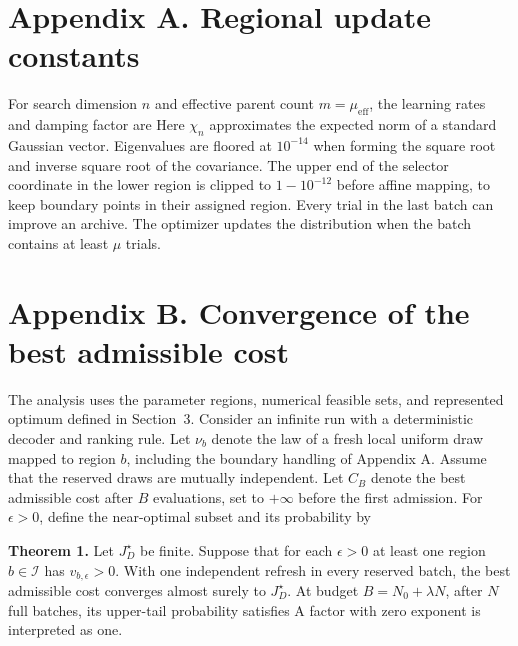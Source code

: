 \appendix
\section*{Appendix A. Regional update constants}
For search dimension $n$ and effective parent count $m=\mu_{\mathrm{eff}}$, the learning rates and damping factor are
Here $\chi_n$ approximates the expected norm of a standard Gaussian vector. Eigenvalues are floored at $10^{-14}$ when forming the square root and inverse square root of the covariance. The upper end of the selector coordinate in the lower region is clipped to $1-10^{-12}$ before affine mapping, to keep boundary points in their assigned region. Every trial in the last batch can improve an archive. The optimizer updates the distribution when the batch contains at least $\mu$ trials.

\section*{Appendix B. Convergence of the best admissible cost}
The analysis uses the parameter regions, numerical feasible sets, and represented optimum defined in Section~3. Consider an infinite run with a deterministic decoder and ranking rule. Let $\nu_b$ denote the law of a fresh local uniform draw mapped to region $b$, including the boundary handling of Appendix A. Assume that the reserved draws are mutually independent. Let $C_B$ denote the best admissible cost after $B$ evaluations, set to $+\infty$ before the first admission. For $\epsilon>0$, define the near-optimal subset and its probability by

\textbf{Theorem 1.} Let $J_D^\star$ be finite. Suppose that for each $\epsilon>0$ at least one region $b\in\mathcal I$ has $v_{b,\epsilon}>0$. With one independent refresh in every reserved batch, the best admissible cost converges almost surely to $J_D^\star$. At budget $B=N_0+\lambda N$, after $N$ full batches, its upper-tail probability satisfies
A factor with zero exponent is interpreted as one.

